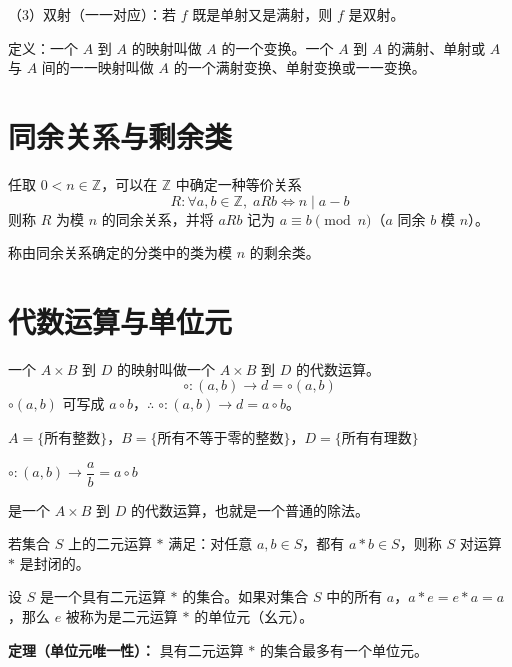 \begin{definition}[单射、满射与双射]
（3）双射（一一对应）：若 $f$ 既是单射又是满射，则 $f$ 是双射。

定义：一个 $A$ 到 $A$ 的映射叫做 $A$ 的一个变换。一个 $A$ 到 $A$ 的满射、单射或 $A$ 与 $A$ 间的一一映射叫做 $A$ 的一个满射变换、单射变换或一一变换。
\end{definition}

\section{同余关系与剩余类}

\begin{definition}[模 $n$ 的同余关系与剩余类]
任取 $0<n\in\mathbb{Z}$，可以在 $\mathbb{Z}$ 中确定一种等价关系
\[
R:\forall a,b\in\mathbb{Z},\;aRb\Leftrightarrow n\mid a-b
\]
则称 $R$ 为模 $n$ 的同余关系，并将 $aRb$ 记为 $a\equiv b\pmod{n}$（$a$ 同余 $b$ 模 $n$）。

称由同余关系确定的分类中的类为模 $n$ 的剩余类。
\end{definition}

\section{代数运算与单位元}

\begin{definition}[代数运算]
一个 $A\times B$ 到 $D$ 的映射叫做一个 $A\times B$ 到 $D$ 的代数运算。
\[
\circ:(a,b)\to d=\circ(a,b)
\]
$\circ(a,b)$ 可写成 $a\circ b$，$\therefore\;\circ:(a,b)\to d=a\circ b$。
\end{definition}

\begin{example}
$A=\{\text{所有整数}\}$，$B=\{\text{所有不等于零的整数}\}$，$D=\{\text{所有有理数}\}$

$\circ:(a,b)\to\dfrac{a}{b}=a\circ b$

是一个 $A\times B$ 到 $D$ 的代数运算，也就是一个普通的除法。
\end{example}

\begin{definition}[封闭性]
若集合 $S$ 上的二元运算 $*$ 满足：对任意 $a,b\in S$，都有 $a*b\in S$，则称 $S$ 对运算 $*$ 是封闭的。
\end{definition}

\begin{definition}[单位元]
设 $S$ 是一个具有二元运算 $*$ 的集合。如果对集合 $S$ 中的所有 $a$，$a*e=e*a=a$，那么 $e$ 被称为是二元运算 $*$ 的单位元（幺元）。

\textbf{定理（单位元唯一性）：} 具有二元运算 $*$ 的集合最多有一个单位元。
\end{definition}

